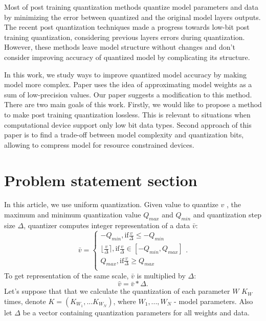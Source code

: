 \documentclass{article}
\begin{document}
Most of post training quantization methods quantize model parameters and data by minimizing the error between quantized and the original model layers outputs. The recent post quantization techniques  \citep{adaquant, BreQ} made a progress towards low-bit post training quantization, considering previous layers errors during quantization. However, these methods leave model structure 
without changes and don't consider improving accuracy of quantized model by complicating its structure.  

In this work, we study ways to improve quantized model accuracy by making model more complex. Paper  \citep{multiple_points}  uses the idea of approximating model weights as a sum of low-precision values. Our paper suggests a modification to this method.  There are two main goals of this work. Firstly, we would like to propose a method to make post training quantization lossless. This is relevant to situations when computational device support only low bit data types. Second approach of this paper is to find a trade-off between model complexity and quantization bits, allowing to compress model for resource constrained devices.  








\section{Problem statement section}
\label{sec:headings}
In this article, we use uniform quantization. Given value to quantize $v$ , the maximum and minimum quantization value $Q_{max}$ and $Q_{min}$ and quantization step size $\Delta$, quantizer computes integer representation of a data $\bar{v}$:
$$
 \bar{v} =
\begin{cases}
    -Q_{min}, \text{if} \frac{v}{\Delta} \leq -Q_{min}\\
    \lfloor\frac{v}{\Delta}\rceil, \text{if} \frac{v}{\Delta} \in [-Q_{min}, Q_{max}]\\
    Q_{max}, \text{if} \frac{v}{\Delta} \geq Q_{max}\\
\end{cases}.
$$
To get representation of the same scale, $\bar{v}$ is multiplied by $\Delta$:
$$
\hat{v} = \bar{v} * \Delta.
$$
Let's suppose that that we calculate the quantization of each parameter $W$ $K_W$ times, denote $K = (K_{W_1}, ... K_{W_N})$, where $W_1, ..., W_N$ - model parameters.
Also let $\Delta$ be a vector containing quantization parameters for all weights and data. \\
\end{document}
